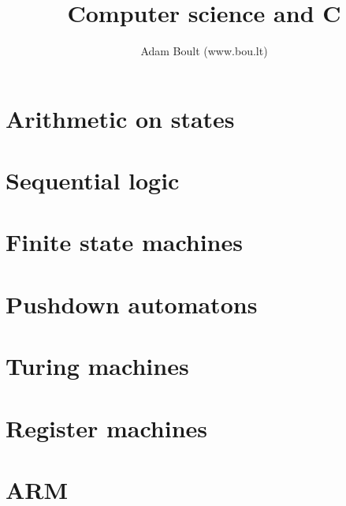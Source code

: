 \documentclass[oneside]{book}
\begin{document}
\author{Adam Boult (www.bou.lt)}
\title{Computer science and C}
\maketitle

\setcounter{tocdepth}{0}
\tableofcontents



\part{Arithmetic on states}






\part{Sequential logic}



\part{Finite state machines}



\part{Pushdown automatons}



\part{Turing machines}




\part{Register machines}





\part{ARM}









\end{document}

